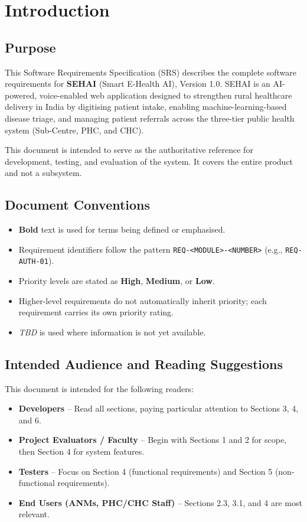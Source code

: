 \documentclass[12pt,a4paper]{article}
\begin{document}
\section{Introduction}

\subsection{Purpose}
This Software Requirements Specification (SRS) describes the complete software requirements for \textbf{SEHAI} (Smart E-Health AI), Version 1.0. SEHAI is an AI-powered, voice-enabled web application designed to strengthen rural healthcare delivery in India by digitising patient intake, enabling machine-learning-based disease triage, and managing patient referrals across the three-tier public health system (Sub-Centre, PHC, and CHC).

This document is intended to serve as the authoritative reference for development, testing, and evaluation of the system. It covers the entire product and not a subsystem.

\subsection{Document Conventions}
\begin{itemize}
    \item \textbf{Bold} text is used for terms being defined or emphasised.
    \item Requirement identifiers follow the pattern \texttt{REQ-<MODULE>-<NUMBER>} (e.g., \texttt{REQ-AUTH-01}).
    \item Priority levels are stated as \textbf{High}, \textbf{Medium}, or \textbf{Low}.
    \item Higher-level requirements do not automatically inherit priority; each requirement carries its own priority rating.
    \item \textit{TBD} is used where information is not yet available.
\end{itemize}

\subsection{Intended Audience and Reading Suggestions}
This document is intended for the following readers:

\begin{itemize}
    \item \textbf{Developers} -- Read all sections, paying particular attention to Sections 3, 4, and 6.
    \item \textbf{Project Evaluators / Faculty} -- Begin with Sections 1 and 2 for scope, then Section 4 for system features.
    \item \textbf{Testers} -- Focus on Section 4 (functional requirements) and Section 5 (non-functional requirements).
    \item \textbf{End Users (ANMs, PHC/CHC Staff)} -- Sections 2.3, 3.1, and 4 are most relevant.
\end{itemize}
\end{document}
